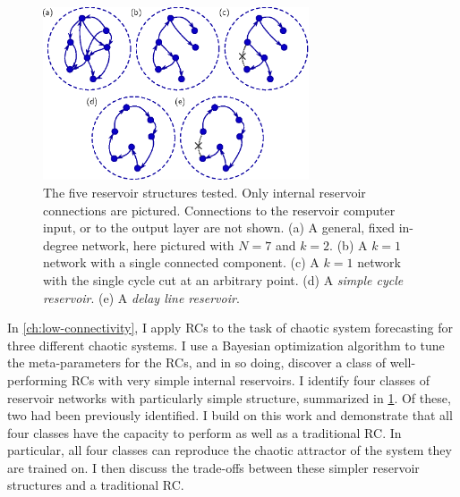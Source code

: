 \begin{figure}
  \includegraphics[width=0.7\textwidth]{figures/topology}
  \caption{The five reservoir structures tested. Only internal
    reservoir connections are pictured. Connections to the reservoir
    computer input, or to the output layer are not shown. (a) A
    general, fixed in-degree network, here pictured with $N=7$ and
    $k=2$. (b) A $k=1$ network with a single connected component. (c)
    A $k=1$ network with the single cycle cut at an arbitrary
    point. (d) A \emph{simple cycle reservoir}. (e) A \emph{delay line
      reservoir}.}%
  \label{fig:intro-topology}
\end{figure}

In \cref{ch:low-connectivity}, I apply RCs to the task of chaotic
system forecasting for three different chaotic systems. I use a
Bayesian optimization algorithm to tune the meta-parameters for the
RCs, and in so doing, discover a class of well-performing RCs with
very simple internal reservoirs. I identify four classes of reservoir
networks with particularly simple structure, summarized in
\cref{fig:intro-topology}. Of these, two had been previously identified. I
build on this work and demonstrate that all four classes have the
capacity to perform as well as a traditional RC. In particular, all
four classes can reproduce the chaotic attractor of the system they
are trained on. I then discuss the trade-offs between these simpler
reservoir structures and a traditional RC.

